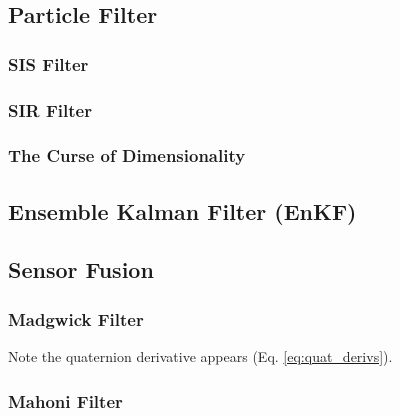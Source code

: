 \documentclass[../notes.tex]{subfiles}
\begin{document}
\subsection{Particle Filter}
\subsubsection{SIS Filter}
\subsubsection{SIR Filter}
\subsubsection{The Curse of Dimensionality}
\subsection{Ensemble Kalman Filter (EnKF)}
\subsection{Sensor Fusion}
\subsubsection{Madgwick Filter}
Note the quaternion derivative appears (Eq. \ref{eq:quat_derivs}).
\subsubsection{Mahoni Filter}
\end{document}
